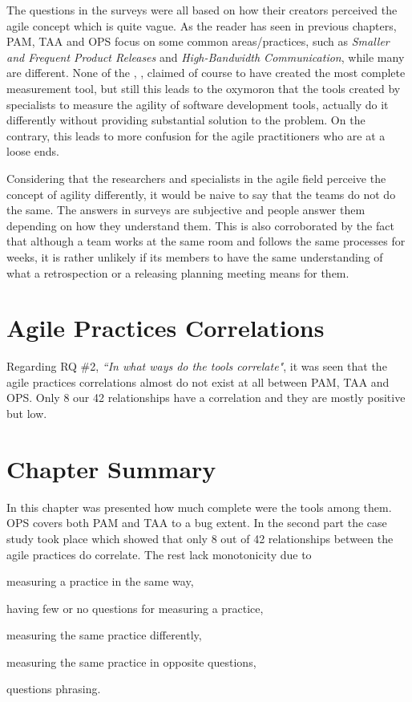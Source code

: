 The questions in the surveys were all based on how their creators perceived the agile concept which is quite vague. As the reader has seen in previous chapters, \ac{PAM}, \ac{TAA} and \ac{OPS} focus on some common areas/practices, such as  \textit{Smaller and Frequent Product Releases} and \textit{High-Bandwidth Communication}, while many are different. None of the \citet{sventha_dissertation}, \citet{pam}, \citet{Leffingwell} claimed of course to have created the most complete measurement tool, but still this leads to the oxymoron that the tools created by specialists to measure the agility of software development tools, actually do it differently without providing substantial solution to the problem. On the contrary, this leads to more confusion for the agile practitioners who are at a loose ends.

Considering that the researchers and specialists in the agile field perceive the concept of agility differently, it would be naive to say that the teams do not do the same. The answers in surveys are subjective and people answer them depending on how they understand them. This is also corroborated by the fact that although a team works at the same room and follows the same processes for weeks, it is rather unlikely if its members to have the same understanding of what a retrospection or a releasing planning meeting means for them.

\section{Agile Practices Correlations}
Regarding RQ \#2, \textit{``In what ways do the tools correlate"}, it was seen that the agile practices correlations almost do not exist at all between \ac{PAM}, \ac{TAA} and \ac{OPS}. Only 8 our 42 relationships have a correlation and they are mostly positive but low.

\section{Chapter Summary}
In this chapter was presented how much complete were the tools among them. \ac{OPS} covers both \ac{PAM} and \ac{TAA} to a bug extent. In the second part the case study took place which showed that only 8 out of 42 relationships between the agile practices do correlate. The rest lack monotonicity due to
\begin{inparaenum} [a\upshape)]
	\item measuring a practice in the same way,
	\item having few or no questions for measuring a practice,
	\item measuring the same practice differently,
	\item measuring the same practice in opposite questions,
	\item questions phrasing.
\end{inparaenum}

